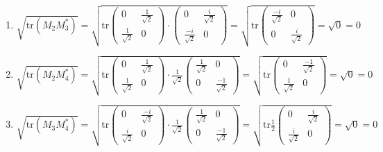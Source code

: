 \documentclass{report}
\begin{document}
\begin{enumerate}
\begin{enumerate}[label=\alph*)]
\begin{enumerate}
    
     
    
     
    \item $\sqrt{\text{tr}(M_2 M_3^*)} = \sqrt{\text{tr} \begin{pmatrix}
    0 & \frac{1}{\sqrt{2}}\\
    \frac{1}{\sqrt{2}} & 0
    \end{pmatrix} \cdot \begin{pmatrix}
    0 & \frac{i}{\sqrt{2}}\\
    \frac{-i}{\sqrt{2}} & 0
    \end{pmatrix}  }= \sqrt{\text{tr}  \begin{pmatrix}
    \frac{-i}{\sqrt{2}} & 0\\
    0 & \frac{i}{\sqrt{2}}
    \end{pmatrix}} = \sqrt{0} = 0 $
    
    
    
    \item $\sqrt{\text{tr}(M_2 M_4^*)} = \sqrt{\text{tr} \begin{pmatrix}
    0 & \frac{1}{\sqrt{2}}\\
    \frac{1}{\sqrt{2}} & 0
    \end{pmatrix} \cdot \frac{1}{\sqrt{2}}\begin{pmatrix}
    \frac{1}{\sqrt{2}} & 0\\
    0 & \frac{-1}{\sqrt{2}}
    \end{pmatrix}  }= \sqrt{\text{tr}  \begin{pmatrix}
    0 & \frac{-1}{\sqrt{2}}\\
    \frac{1}{\sqrt{2}} & 0
    \end{pmatrix} } = \sqrt{0} = 0 $
    
    
     
    \item  $\sqrt{\text{tr}(M_3 M_4^*)} = \sqrt{\text{tr} \begin{pmatrix}
    0 & \frac{-i}{\sqrt{2}}\\
    \frac{i}{\sqrt{2}} & 0
    \end{pmatrix} \cdot \frac{1}{\sqrt{2}}\begin{pmatrix}
    \frac{1}{\sqrt{2}} & 0\\
    0 & \frac{-1}{\sqrt{2}}
    \end{pmatrix}  }= \sqrt{\text{tr} \frac{1}{2} \begin{pmatrix}
    0 & \frac{i}{\sqrt{2}}\\
    \frac{i}{\sqrt{2}} & 0
    \end{pmatrix} } = \sqrt{0} = 0 $
    

\end{enumerate}
\end{enumerate}
\end{enumerate}
\end{document}
